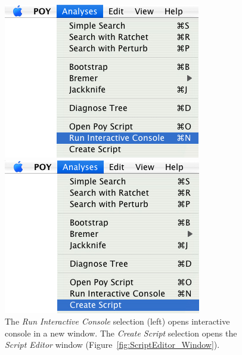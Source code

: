 \begin{figure}
\centering
\begin{minipage}[c]{0.48\textwidth}
   		\includegraphics[width=\textwidth]{doc/figures/runinteractive_menu.jpg}
\end{minipage}
\quad
\begin{minipage}[c]{0.48\textwidth}
	   	\includegraphics[width=\textwidth]{doc/figures/create_script_window.jpg}
   	\end{minipage}
\caption{The \emph{Run Interactive Console} selection (left) opens \poy interactive console in a new window. The \emph{Create Script} selection opens the \emph{Script Editor} window (Figure~\ref{fig:ScriptEditor_Window}).}
\label{fig:runinteractive}
\end{figure}

